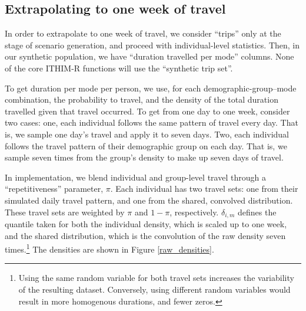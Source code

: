 \documentclass{article}
\begin{document}
\begin{appendix}
\subsection{Extrapolating to one week of travel}\label{Extrapolation}


In order to extrapolate to one week of travel, we consider ``trips'' only at the stage of scenario generation, and proceed with individual-level statistics. Then, in our synthetic population, we have ``duration travelled per mode'' columns. None of the core ITHIM-R functions will use the ``synthetic trip set''.

To get duration per mode per person, we use, for each demographic-group--mode combination, the probability to travel, and the density of the total duration travelled given that travel occurred. To get from one day to one week, consider two cases: one, each individual follows the same pattern of travel every day. That is, we sample one day's travel and apply it to seven days. Two, each individual follows the travel pattern of their demographic group on each day. That is, we sample seven times from the group's density to make up seven days of travel.%

In implementation, we blend individual and group-level travel through a ``repetitiveness'' parameter, $\pi$. Each individual has two travel sets: one from their simulated daily travel pattern, and one from the shared, convolved distribution. These travel sets are weighted by $\pi$ and $1-\pi$, respectively. $\delta_{i,m}$ defines the quantile taken for both the individual density, which is scaled up to one week, and the shared distribution, which  is the convolution of the raw density seven times.\footnote{Using the same random variable for both travel sets increases the variability of the resulting dataset. Conversely, using different random variables would result in more homogenous durations, and fewer zeros.} The densities are shown in Figure \ref{raw_densities}.


\end{appendix}
\end{document}
